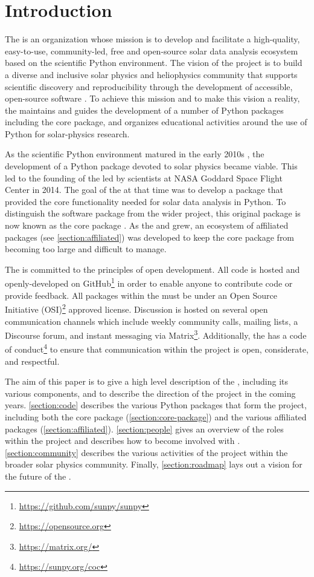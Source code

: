 \section{Introduction}
\label{sec:intro}

The \sunpyproj is an organization whose mission is to develop and facilitate a high-quality, easy-to-use, community-led, free and open-source solar data analysis ecosystem based on the scientific Python environment.
The vision of the project is to build a diverse and inclusive solar physics and heliophysics community that supports scientific discovery and reproducibility through the development of accessible, open-source software \citep{bobra_monica_2020_7020094}.
To achieve this mission and to make this vision a reality, the \sunpyproj maintains and guides the development of a number of Python packages including the \sunpypkg core package, and organizes educational activities around the use of Python for solar-physics research.

As the scientific Python environment matured in the early 2010s \citep{Hunter:2007, harris2020array, 2020SciPy-NMeth}, the development of a Python package devoted to solar physics became viable.
This led to the founding of the \sunpyproj led by scientists at NASA Goddard Space Flight Center in 2014.
The goal of the \sunpyproj at that time was to develop a package that provided the core functionality needed for solar data analysis in Python.
To distinguish the software package from the wider project, this original package is now known as the \sunpypkg core package \citep{sunpy_community2020}.
As the \sunpyproj and \sunpypkg grew, an ecosystem of affiliated packages (see \autoref{section:affiliated}) was developed to keep the \sunpypkg core package from becoming too large and difficult to manage.

The \sunpyproj is committed to the principles of open development.
All code is hosted and openly-developed on GitHub\footnote{\url{https://github.com/sunpy/sunpy}} in order to enable anyone to contribute code or provide feedback.
All packages within the \sunpyproj must be under an Open Source Initiative (OSI)\footnote{\url{https://opensource.org}} approved license.
Discussion is hosted on several open communication channels which include weekly community calls, mailing lists, a Discourse forum, and instant messaging via Matrix\footnote{\url{https://matrix.org/}}.
Additionally, the \sunpyproj has a code of conduct\footnote{\url{https://sunpy.org/coc}} to ensure that communication within the project is open, considerate, and respectful.

The aim of this paper is to give a high level description of the \sunpyproj, including its various components, and to describe the direction of the project in the coming years.
\autoref{section:code} describes the various Python packages that form the project, including both the \sunpypkg core package (\autoref{section:core-package}) and the various affiliated packages (\autoref{section:affiliated}).
\autoref{section:people} gives an overview of the roles within the project and describes how to become involved with \sunpyproj.
\autoref{section:community} describes the various activities of the project within the broader solar physics community.
Finally, \autoref{section:roadmap} lays out a vision for the future of the \sunpyproj.
